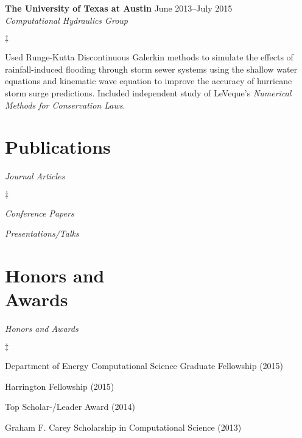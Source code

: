 \documentclass[margin,line]{res}
\newenvironment{list2}{
  \begin{list}{$\ddagger$}{%
      \setlength{\itemsep}{0in}
      \setlength{\parsep}{0in} \setlength{\parskip}{0in}
      \setlength{\topsep}{0in} \setlength{\partopsep}{0in}
      \setlength{\leftmargin}{0.2in}}}{\end{list}}
\begin{document}
\begin{resume}
\textbf{The University of Texas at Austin} \hfill June 2013--July 2015\\
\textit{Computational Hydraulics Group}
\vspace{0.05in}
\begin{list2}
\item[] Used Runge-Kutta Discontinuous Galerkin methods to simulate the effects of rainfall-induced flooding through storm sewer systems using the shallow water equations and kinematic wave equation to improve the accuracy of hurricane storm surge predictions. Included independent study of LeVeque's \textit{Numerical Methods for Conservation Laws}.
\end{list2}

\section{\sc Publications}
\textit{Journal Articles}
\vspace{0.05in}
\begin{list2} 
\end{list2} 
\textit{Conference Papers}
\vspace{0.05in}

\textit{Presentations/Talks}
\vspace{0.05in}

\section{\sc Honors and \\ Awards}

\textit{Honors and Awards} 
\vspace{0.05in}
\begin{list2}
\item[] Department of Energy Computational Science Graduate Fellowship (2015)
\item[] Harrington Fellowship (2015)
\item[] Top Scholar-/Leader Award (2014)
\item[] Graham F. Carey Scholarship in Computational Science (2013)
\end{list2} 




\end{resume}
\end{document}
